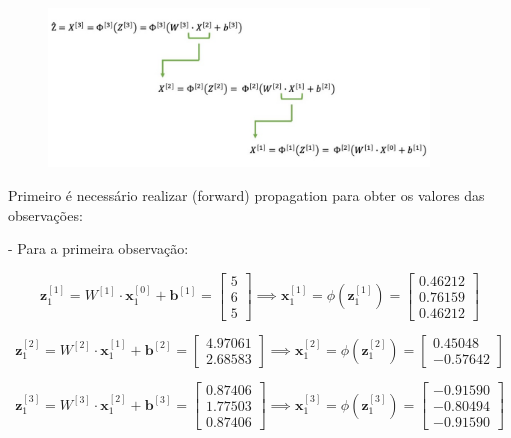 \documentclass[a4paper,12pt]{article} %
\begin{document}
\begin{enumerate}
\begin{figure}[H]
    \centering
    \includegraphics[width=0.9\textwidth]{equacoes.jpg}
\end{figure}

Primeiro é necessário realizar (forward) propagation para obter os valores das observações:

- Para a primeira observação:

\begin{equation*}
    \textbf{z}^{[1]}_1 = W^{[1]} \cdot \textbf{x}^{[0]}_1 + \textbf{b}^{[1]} = \begin{bmatrix} 5 \\ 6 \\ 5 \end{bmatrix} \implies \textbf{x}^{[1]}_1 = \phi(\textbf{z}^{[1]}_1)= \begin{bmatrix} 0.46212 \\ 0.76159 \\ 0.46212 \end{bmatrix}
\end{equation*}

\begin{equation*}
    \textbf{z}^{[2]}_1 = W^{[2]} \cdot \textbf{x}^{[1]}_1 + \textbf{b}^{[2]} = \begin{bmatrix} 4.97061 \\ 2.68583 \end{bmatrix} \implies \textbf{x}^{[2]}_1 = \phi(\textbf{z}^{[2]}_1)= \begin{bmatrix} 0.45048 \\ -0.57642 \end{bmatrix}
\end{equation*}

\begin{equation*}
    \textbf{z}^{[3]}_1 = W^{[3]} \cdot \textbf{x}^{[2]}_1 + \textbf{b}^{[3]} = \begin{bmatrix} 0.87406 \\ 1.77503 \\ 0.87406 \end{bmatrix} \implies \textbf{x}^{[3]}_1 = \phi(\textbf{z}^{[3]}_1)= \begin{bmatrix} -0.91590 \\ -0.80494\\ -0.91590 \end{bmatrix}
\end{equation*}


\end{enumerate}
\end{document}
